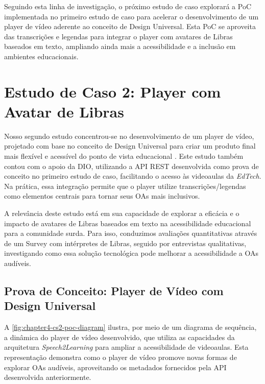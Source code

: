 Seguindo esta linha de investigação, o próximo estudo de caso explorará a PoC implementada no primeiro estudo de caso para acelerar o desenvolvimento de um player de vídeo aderente ao conceito de Design Universal. Esta PoC se aproveita das transcrições e legendas para integrar o player com avatares de Libras baseados em texto, ampliando ainda mais a acessibilidade e a inclusão em ambientes educacionais.

\section{Estudo de Caso 2: Player com Avatar de Libras}

Nosso segundo estudo concentrou-se no desenvolvimento de um player de vídeo, projetado com base no conceito de Design Universal para criar um produto final mais flexível e acessível do ponto de vista educacional \cite{GovBr2023}. Este estudo também contou com o apoio da DIO, utilizando a API REST desenvolvida como prova de conceito no primeiro estudo de caso, facilitando o acesso às videoaulas da \textit{EdTech}. Na prática, essa integração permite que o player utilize transcrições/legendas como elementos centrais para tornar seus OAs mais inclusivos.

A relevância deste estudo está em sua capacidade de explorar a eficácia e o impacto de avatares de Libras baseados em texto na acessibilidade educacional para a comunidade surda. Para isso, conduzimos avaliações quantitativas através de um Survey com intérpretes de Libras, seguido por entrevistas qualitativas, investigando como essa solução tecnológica pode melhorar a acessibilidade a OAs audíveis.

\subsection{Prova de Conceito: Player de Vídeo com Design Universal}

A \autoref{fig:chapter4-cs2-poc-diagram} ilustra, por meio de um diagrama de sequência, a dinâmica do player de vídeo desenvolvido, que utiliza as capacidades da arquitetura \textit{Speech2Learning} para ampliar a acessibilidade de videoaulas. Esta representação demonstra como o player de vídeo promove novas formas de explorar OAs audíveis, aproveitando os metadados fornecidos pela API desenvolvida anteriormente.

